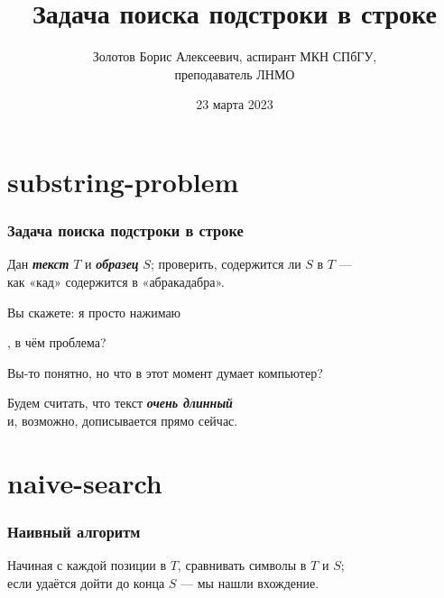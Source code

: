 \documentclass[11pt,aspectratio=169,svgnames]{beamer}
\title{Задача поиска подстроки в строке}
\date{23 марта 2023}
\author{Золотов Борис Алексеевич, аспирант МКН СПбГУ, \\ преподаватель ЛНМО}
\institute{«Лига Лекторов», 3 сезон, полуфинал}
\begin{document}
 \maketitle


\section{substring-problem}

\begin{frame} \frametitle{Задача поиска подстроки в строке}
	Дан {\itshape\bfseries текст} \(T\) и {\itshape\bfseries образец} \(S\); проверить,
	содержится ли \(S\) в \(T\) —\\
	как «кад» содержится в «абракадабра». \bigskip\bigskip \pause

	Вы скажете: я просто нажимаю\ \  , в чём проблема? \bigskip\bigskip \pause

	Вы-то понятно, но что в этот момент думает компьютер? \bigskip \pause

	Будем считать, что текст {\bfseries\itshape очень длинный} \\
	и, возможно, дописывается прямо сейчас.
\end{frame}


\section{naive-search}

\begin{frame} \frametitle{Наивный алгоритм}
Начиная с каждой позиции в \(T\), сравнивать символы в \(T\) и \(S\);\\
если удаётся дойти до конца \(S\) — мы нашли вхождение. \bigskip

\begin{center}  \end{center}
\end{frame}
\end{document}
